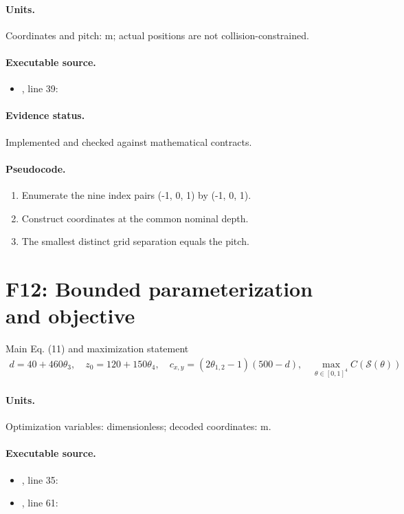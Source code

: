 \documentclass[10pt]{article}
\begin{document}
\paragraph{Units.} Coordinates and pitch: m; actual positions are not collision-constrained.
\paragraph{Executable source.}
\begin{itemize}[leftmargin=*]
\item {}, line 39: 
\end{itemize}
\paragraph{Evidence status.} Implemented and checked against mathematical contracts.
\paragraph{Pseudocode.}
\begin{enumerate}[leftmargin=*]
\item Enumerate the nine index pairs (-1, 0, 1) by (-1, 0, 1).
\item Construct coordinates at the common nominal depth.
\item The smallest distinct grid separation equals the pitch.
\end{enumerate}
\newpage
\section*{F12: Bounded parameterization and objective}
Main Eq. (11) and maximization statement
\begin{gather*}d=40+460\theta_3,\quad z_0=120+150\theta_4,\quad c_{x,y}=(2\theta_{1,2}-1)(500-d),\quad\max_{\theta\in[0,1]^4}C(\mathcal S(\theta))\end{gather*}
\paragraph{Units.} Optimization variables: dimensionless; decoded coordinates: m.
\paragraph{Executable source.}
\begin{itemize}[leftmargin=*]
\item {}, line 35: 
\item {}, line 61: 
\end{itemize}
\end{document}
